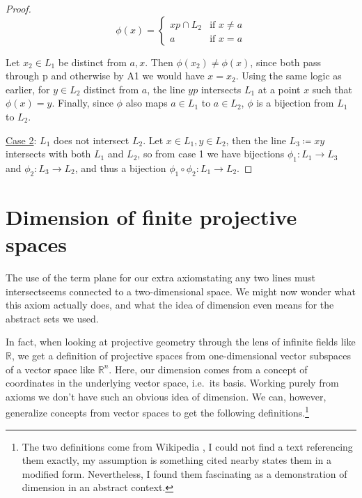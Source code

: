 \documentclass[12pt]{article}
\begin{document}
\begin{proof}
        \[
            \phi(x) =
            \begin{cases}
                xp \cap L_2 & \text{if } x \neq a \\
                a & \text{if } x = a
            \end{cases}
        \]

        Let $x_2\in L_1$ be distinct from $a, x$.
        Then $\phi(x_2) \neq \phi(x)$,
        since both pass through p and otherwise by A1 we would have $x = x_2$.
        Using the same logic as earlier, for $y \in L_2$ distinct from $a$, the line $yp$ intersects $L_1$ at a point $x$ such that $\phi(x)=y$.
        Finally, since $\phi$ also maps $a \in L_1$ to $a \in L_2$, $\phi$ is a bijection from $L_1$ to $L_2$.

        \underline{Case 2}: $L_1$ does not intersect $L_2$.
        Let $x \in L_1, y \in L_2$, then the line $L_3 \coloneqq xy$ intersects with both $L_1$ and $L_2$, so from case 1 we have bijections
        $\phi_1: L_1 \rightarrow L_3$ and $\phi_2: L_3 \rightarrow L_2$, and thus a bijection $\phi_1 \circ \phi_2: L_1 \rightarrow L_2$.
    \end{proof}


    \section{Dimension of finite projective spaces}

    The use of the term plane for our extra axiom\textemdash stating any two lines must intersect\textemdash seems connected to a two-dimensional space.
    We might now wonder what this axiom actually does, and what the idea of dimension even means for the abstract sets we used.

    In fact, when looking at projective geometry through the lens of infinite fields like $\mathbb{R}$,
    we get a definition of projective spaces from one-dimensional vector subspaces of a vector space like $\mathbb{R}^n$\cite{weisstein_projective_nodate}.
    Here, our dimension comes from a concept of coordinates in the underlying vector space, i.e.\ its basis.
    Working purely from axioms we don't have such an obvious idea of dimension.
    We can, however, generalize concepts from vector spaces to get the following definitions.\footnote{
        The two definitions come from Wikipedia \cite{noauthor_projective_2024},
        I could not find a text referencing them exactly, my assumption is something cited nearby states them in a modified form.
        Nevertheless, I found them fascinating as a demonstration of dimension in an abstract context.
    }
\end{document}
